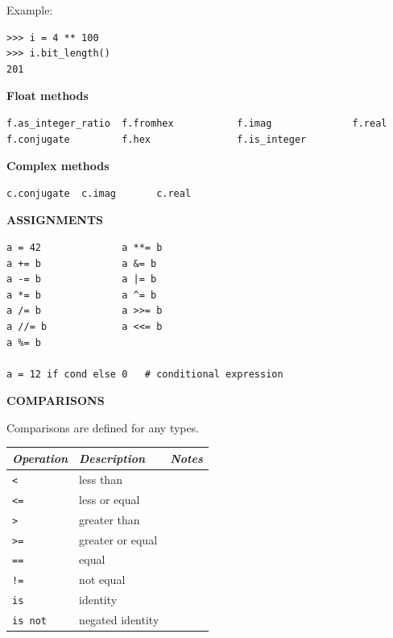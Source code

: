 \documentclass[9pt,a4wide]{extarticle}
\begin{document}
Example:

\begin{verbatim}
>>> i = 4 ** 100
>>> i.bit_length()
201
\end{verbatim}


\bigskip
{\LARGE\bf Float methods}

\begin{verbatim}
f.as_integer_ratio  f.fromhex           f.imag              f.real              
f.conjugate         f.hex               f.is_integer        
\end{verbatim}



\bigskip
{\LARGE\bf Complex methods}

\begin{verbatim}
c.conjugate  c.imag       c.real
\end{verbatim}




\bigskip
{\LARGE\bf ASSIGNMENTS}


\begin{verbatim}
a = 42              a **= b  
a += b              a &= b
a -= b              a |= b
a *= b              a ^= b
a /= b              a >>= b
a //= b             a <<= b
a %= b

a = 12 if cond else 0   # conditional expression
\end{verbatim}




\bigskip
{\LARGE\bf COMPARISONS}

\medskip

Comparisons are defined for any types.

\medskip

\begin{supertabular}{|l|p{12cm}|c|}\hline
{\em Operation}      & {\em Description}        &  {\em Notes} \\ \hline\hline

{\tt < }                   & less than                &        \\ \hline
{\tt <=}                   & less or equal            &        \\ \hline
{\tt > }                   & greater than             &        \\ \hline
{\tt >=}                   & greater or equal         &        \\ \hline
{\tt ==}                   & equal                    &        \\ \hline
{\tt !=}                   & not equal                &        \\ \hline
{\tt is}                   & identity                 &        \\ \hline
{\tt is not}               & negated identity         &        \\ \hline
\end{supertabular}
\end{document}
